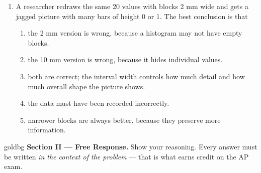 \documentclass[12pt]{article}
\begin{document}
\begin{enumerate}[leftmargin=1.9em, itemsep=0.13in]
  \item A researcher redraws the same 20 values with blocks 2 mm wide and gets a jagged picture
        with many bars of height 0 or 1. The best conclusion is that
        \begin{enumerate}[label=\textbf{(\Alph*)}, leftmargin=2.2em, itemsep=2pt]
          \item the 2 mm version is wrong, because a histogram may not have empty blocks.
          \item the 10 mm version is wrong, because it hides individual values.
          \item both are correct; the interval width controls how much detail and how much
                overall shape the picture shows.
          \item the data must have been recorded incorrectly.
                \hfill{}
          \item narrower blocks are always better, because they preserve more information.
        \end{enumerate}

\end{enumerate}

\vspace{0.14in}

\boxguard[16]
\begin{headlinebox}{goldbg}
\small
\textbf{Section II --- Free Response.} Show your reasoning. Every answer must be written
\emph{in the context of the problem} --- that is what earns credit on the AP exam.
\end{headlinebox}

\vspace{0.10in}
\end{document}
